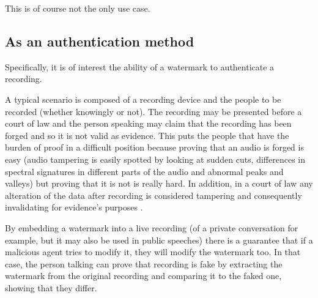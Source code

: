 This is of course not the only use case. 

\subsection{As an authentication method}


Specifically, it is of interest the ability of a watermark to authenticate a recording.



A typical scenario is composed of a recording device and the people to be recorded (whether knowingly or not). The recording may be presented before a court of law and the person speaking may claim that the recording has been forged and so it is not valid as evidence. This puts the people that have the burden of proof in a difficult position because proving that an audio is forged is easy (audio tampering is easily spotted by looking at sudden cuts, differences in spectral signatures in different parts of the audio and abnormal peaks and valleys) but proving that it is not is really hard. In addition, in a court of law any alteration of the data after recording is considered tampering and consequently invalidating for evidence's purposes \cite[pp. 2-3, “Live audio watermarking for forensics”]{tictac}.

By embedding a watermark into a live recording (of a private conversation for example, but it may also be used in public speeches) there is a guarantee that if a malicious agent tries to modify it, they will modify the watermark too. In that case, the person talking can prove that recording is fake by extracting the watermark from the original recording and comparing it to the faked one, showing that they differ.


